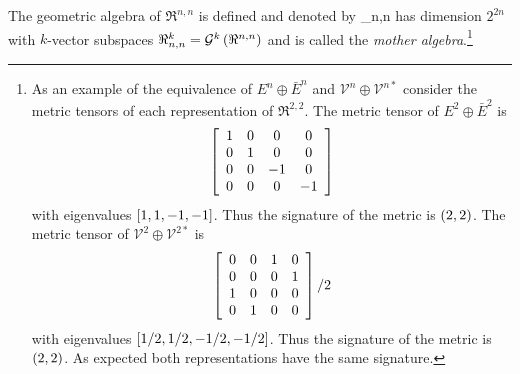 The geometric algebra of $\Re^{n,n}$ is defined and denoted by
\be
	\Re_{n,n} \equiv {}
\ee
has dimension $2^{2n}$ with $k$-vector subspaces $\Re_{n,n}^{k}={\mathcal{G}^{k}}\left ( {\Re^{n,n}} \right )$ and is 
called the {\em mother algebra}.\footnote{ 
As an example of the equivalence of $E^{n}\oplus \bar{E}^{n}$ and $\mathcal{V}^{n}\oplus \mathcal{V}^{n*}$ consider
the metric tensors of each representation of $\Re^{2,2}$. The metric tensor of $E^{2}\oplus \bar{E}^{2}$ is
\begin{equation*}
	\left [ {
		\begin{array}{cccc}
			1 & 0 & 0 & 0 \\
			0 & 1 & 0 & 0 \\
			0 & 0 & -1 & 0 \\
			0 & 0 & 0 & -1 
		\end{array}}\right ]
\end{equation*}
with eigenvalues $\left [ {1,1,-1,-1}\right ]$.  Thus the signature of the metric is $\left ( {2,2} \right )$. The metric tensor of
$\mathcal{V}^{2}\oplus \mathcal{V}^{2*}$ is 
\begin{equation*}
	\left [ {
		\begin{array}{cccc}
			0 & 0 & 1 & 0 \\
			0 & 0 & 0 & 1 \\
			1 & 0 & 0 & 0 \\
			0 & 1 & 0 & 0 
		\end{array}}\right ]/2
\end{equation*}
with eigenvalues $\left [ {1/2,1/2,-1/2,-1/2}\right ]$.  Thus the signature of the metric is $\left ( {2,2} \right )$.  As expected both
representations have the same signature.} 

